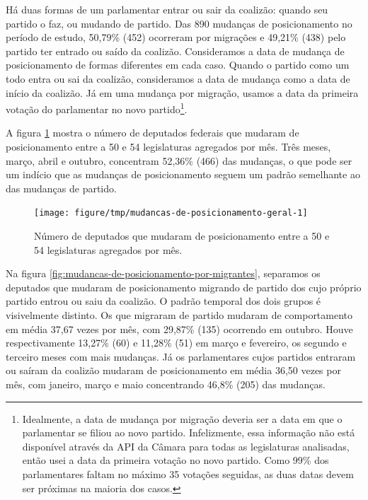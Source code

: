 \documentclass[a4paper,titlepage]{ppgi}\usepackage[]{graphicx}\usepackage[]{color}
\newenvironment{knitrout}{}{} %
\begin{document}
Há duas formas de um parlamentar entrar ou sair da coalizão: quando seu partido
o faz, ou mudando de partido. Das 890 mudanças de
posicionamento no período de estudo,
50,79\% (452)
ocorreram por migrações e
49,21\% (438)
pelo partido ter entrado ou saído da coalizão. Consideramos a data de mudança
de posicionamento de formas diferentes em cada caso. Quando o partido como um
todo entra ou sai da coalizão, consideramos a data de mudança como a data de
início da coalizão. Já em uma mudança por migração, usamos a data da primeira
votação do parlamentar no novo partido\footnote{Idealmente, a data de mudança
por migração deveria ser a data em que o parlamentar se filiou ao novo partido.
Infelizmente, essa informação não está disponível através da \gls{API} da
Câmara para todas as legislaturas analisadas, então usei a data da primeira
votação no novo partido. Como 99\% dos parlamentares faltam no máximo 35
votações seguidas, as duas datas devem ser próximas na maioria dos casos.}.

A figura \ref{fig:mudancas-de-posicionamento-geral} mostra o número de
deputados federais que mudaram de posicionamento entre a 50\textordfeminine{} e
54\textordfeminine{} legislaturas agregados por mês. Três meses, março, abril e
outubro, concentram
52,36\%
(466) das mudanças, o que pode
ser um indício que as mudanças de posicionamento seguem um padrão semelhante ao
das mudanças de partido.

\begin{knitrout}
\color{fgcolor}\begin{figure}
\texttt{[image: figure/tmp/mudancas-de-posicionamento-geral-1]} \caption[Número de deputados que mudaram de posicionamento entre a 50\textordfeminine{} e 54\textordfeminine{} legislaturas agregados por mês]{Número de deputados que mudaram de posicionamento entre a 50\textordfeminine{} e 54\textordfeminine{} legislaturas agregados por mês.}\label{fig:mudancas-de-posicionamento-geral}
\end{figure}


\end{knitrout}

Na figura \ref{fig:mudancas-de-posicionamento-por-migrantes}, separamos os
deputados que mudaram de posicionamento migrando de partido dos cujo próprio
partido entrou ou saiu da coalizão. O padrão temporal dos dois grupos é
visivelmente distinto. Os que migraram de partido mudaram de comportamento em
média 37,67 vezes por mês, com
29,87\%
(135) ocorrendo em outubro. Houve respectivamente
13,27\%
(60) e
11,28\%
(51) em março e fevereiro, os segundo e terceiro
meses com mais mudanças. Já os parlamentares cujos partidos entraram ou saíram
da coalizão mudaram de posicionamento em média
36,50 vezes por mês, com janeiro, março e
maio concentrando
46,8\%
(205) das mudanças.
\end{document}
